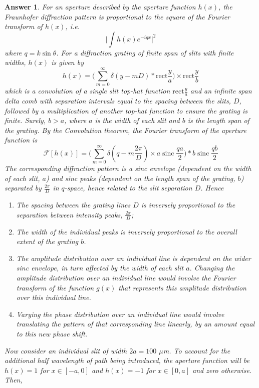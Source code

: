 \documentclass[a4paper]{article}
\DeclareMathOperator{\sinc}{sinc}
\newtheorem{ans}{Answer}[section]
\theoremstyle{new}
\begin{document}
\begin{ans}
For an aperture described by the aperture function $h(x)$, the Fraunhofer diffraction pattern is proportional to the square of the Fourier transform of $h(x)$, i.e.
$$\bigg|\int h(x) e^{-iqx}\bigg|^2$$
where $q=k\sin\theta$. For a diffraction grating of finite span of slits with finite widths, $h(x)$ is given by
$$h(x)=\bigg(\sum_{m=0}^\infty\delta(y-mD)*\text{rect}\frac{y}{a}\bigg)\times\text{rect}\frac{y}{b}$$
which is a convolution of a single slit top-hat function $\text{rect}\frac{y}{a}$ and an infinite span delta comb with separation intervals equal to the spacing between the slits, $D$, followed by a multiplication of another top-hat function to ensure the grating is finite. Surely, $b>a$, where $a$ is the width of each slit and $b$ is the length span of the grating. By the Convolution theorem, the Fourier transform of the aperture function is 
$$\mathcal{F}[h(x)]=\bigg(\sum_{m=0}^\infty\delta(q-m\frac{2\pi}{D})\times a\sinc\frac{qa}{2}\bigg)*b\sinc\frac{qb}{2}$$
The corresponding diffraction pattern is a sinc envelope (dependent on the width of each slit, $a$) and sinc peaks (dependent on the length span of the grating, $b$) separated by $\frac{2\pi}{D}$ in $q$-space, hence related to the slit separation $D$. Hence
\begin{enumerate}[label=(\alph*)]
    \item The spacing between the grating lines $D$ is inversely proportional to the separation between intensity peaks, $\frac{2\pi}{D}$;
    \item The width of the individual peaks is inversely proportional to the overall extent of the grating $b$.
    \item The amplitude distribution over an individual line is dependent on the wider sinc envelope, in turn affected by the width of each slit $a$. Changing the amplitude distribution over an individual line would involve the Fourier transform of the function $g(x)$ that represents this amplitude distribution over this individual line. 
    \item Varying the phase distribution over an individual line would involve translating the pattern of that corresponding line linearly, by an amount equal to this new phase shift.
\end{enumerate}
Now consider an individual slit of width $2a=100$ $\mu$m. To account for the additional half wavelength of path being introduced, the aperture function will be $h(x)=1$ for $x\in[-a,0]$ and $h(x)=-1$ for $x\in[0,a]$ and zero otherwise. Then,

\end{ans}
\end{document}
